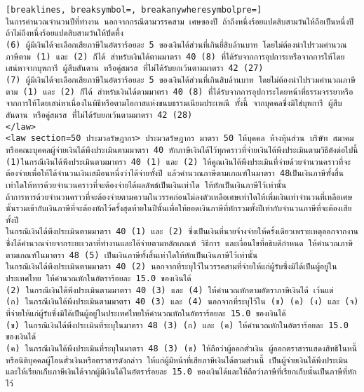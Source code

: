 \begin{Verbatim}[breaklines, breaksymbol=, breakanywheresymbolpre=]
ในการคำนวณจำนวนปีที่ทำงาน นอกจากกรณีตามวรรคสาม เศษของปี ถ้าถึงหนึ่งร้อยแปดสิบสามวันให้ถือเป็นหนึ่งปี ถ้าไม่ถึงหนึ่งร้อยแปดสิบสามวันให้ปัดทิ้ง
(6) ผู้มีเงินได้จะเลือกเสียภาษีในอัตราร้อยละ 5 ของเงินได้ส่วนที่เกินยี่สิบล้านบาท โดยไม่ต้องนำไปรวมคำนวณภาษีตาม (1) และ (2) ก็ได้ สำหรับเงินได้ตามมาตรา 40 (8) ที่ได้รับจากการอุปการะหรือจากการให้โดยเสน่หาจากบุพการี ผู้สืบสันดาน หรือคู่สมรส ที่ไม่ได้รับยกเว้นตามมาตรา 42 (27)
(7) ผู้มีเงินได้จะเลือกเสียภาษีในอัตราร้อยละ 5 ของเงินได้ส่วนที่เกินสิบล้านบาท โดยไม่ต้องนำไปรวมคำนวณภาษีตาม (1) และ (2) ก็ได้ สำหรับเงินได้ตามมาตรา 40 (8) ที่ได้รับจากการอุปการะโดยหน้าที่ธรรมจรรยาหรือจากการให้โดยเสน่หาเนื่องในพิธีหรือตามโอกาสแห่งขนบธรรมเนียมประเพณี ทั้งนี้ จากบุคคลซึ่งมิใช่บุพการี ผู้สืบสันดาน หรือคู่สมรส ที่ไม่ได้รับยกเว้นตามมาตรา 42 (28)
</law>
<law section=50 ประมวลรัษฎากร> ประมวลรัษฎากร มาตรา 50 ให้บุคคล ห้างหุ้นส่วน บริษัท สมาคม หรือคณะบุคคลผู้จ่ายเงินได้พึงประเมินตามมาตรา 40 หักภาษีเงินได้ไว้ทุกคราวที่จ่ายเงินได้พึงประเมินตามวิธีดังต่อไปนี้
(1)ในกรณีเงินได้พึงประเมินตามมาตรา 40 (1) และ (2) ให้คูณเงินได้พึงประเมินที่จ่ายด้วยจำนวนคราวที่จะต้องจ่ายเพื่อให้ได้จำนวนเงินเสมือนหนึ่งว่าได้จ่ายทั้งปี แล้วคำนวณภาษีตามเกณฑ์ในมาตรา 48เป็นเงินภาษีทั้งสิ้นเท่าใดให้หารด้วยจำนวนคราวที่จะต้องจ่ายได้ผลลัพธ์เป็นเงินเท่าใด ให้หักเป็นเงินภาษีไว้เท่านั้น
ถ้าการหารด้วยจำนวนคราวที่จะต้องจ่ายตามความในวรรคก่อนไม่ลงตัวเหลือเศษเท่าใดให้เพิ่มเงินเท่าจำนวนที่เหลือเศษนั้นรวมเข้ากับเงินภาษีที่จะต้องหักไว้ครั้งสุดท้ายในปีนั้นเพื่อให้ยอดเงินภาษีที่หักรวมทั้งปีเท่ากับจำนวนภาษีที่จะต้องเสียทั้งปี
ในกรณีเงินได้พึงประเมินตามมาตรา 40 (1) และ (2) ซึ่งเป็นเงินที่นายจ้างจ่ายให้ครั้งเดียวเพราะเหตุออกจากงาน ซึ่งได้คำนวณจ่ายจากระยะเวลาที่ทำงานและได้จ่ายตามหลักเกณฑ์ วิธีการ และเงื่อนไขที่อธิบดีกำหนด ให้คำนวณภาษีตามเกณฑ์ในมาตรา 48 (5) เป็นเงินภาษีทั้งสิ้นเท่าใดให้หักเป็นเงินภาษีไว้เท่านั้น
ในกรณีเงินได้พึงประเมินตามมาตรา 40 (2) นอกจากที่ระบุไว้ในวรรคสามที่จ่ายให้แก่ผู้รับซึ่งมิได้เป็นผู้อยู่ในประเทศไทย ให้คำนวณหักในอัตราร้อยละ 15.0 ของเงินได้
(2) ในกรณีเงินได้พึงประเมินตามมาตรา 40 (3) และ (4) ให้คำนวณหักตามอัตราภาษีเงินได้ เว้นแต่
(ก) ในกรณีเงินได้พึงประเมินตามมาตรา 40 (3) และ (4) นอกจากที่ระบุไว้ใน (ข) (ค) (ง) และ (จ) ที่จ่ายให้แก่ผู้รับซึ่งมิได้เป็นผู้อยู่ในประเทศไทยให้คำนวณหักในอัตราร้อยละ 15.0 ของเงินได้
(ข) ในกรณีเงินได้พึงประเมินที่ระบุในมาตรา 48 (3) (ก) และ (ค) ให้คำนวณหักในอัตราร้อยละ 15.0 ของเงินได้
(ค) ในกรณีเงินได้พึงประเมินที่ระบุในมาตรา 48 (3) (ข) ให้ถือว่าผู้ออกตั๋วเงิน ผู้ออกตราสารแสดงสิทธิในหนี้ หรือนิติบุคคลผู้โอนตั๋วเงินหรือตราสารดังกล่าว ให้แก่ผู้มีหน้าที่เสียภาษีเงินได้ตามส่วนนี้ เป็นผู้จ่ายเงินได้พึงประเมิน และให้เรียกเก็บภาษีเงินได้จากผู้มีเงินได้ในอัตราร้อยละ 15.0 ของเงินได้และให้ถือว่าภาษีที่เรียกเก็บนั้นเป็นภาษีที่หักไว้

\end{Verbatim}
